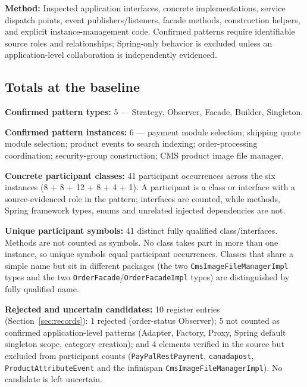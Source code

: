 \documentclass[11pt,a4paper]{article}
\begin{document}
\textbf{Method:} Inspected application interfaces, concrete implementations, service dispatch points, event publishers/listeners, facade methods, construction helpers, and explicit instance-management code. Confirmed patterns require identifiable source roles and relationships; Spring-only behavior is excluded unless an application-level collaboration is independently evidenced.

\subsection{Totals at the baseline}

\textbf{Confirmed pattern types:} 5 --- Strategy, Observer, Facade, Builder, Singleton.

\textbf{Confirmed pattern instances:} 6 --- payment module selection; shipping quote module selection; product events to search indexing; order-processing coordination; security-group construction; CMS product image file manager.

\textbf{Concrete participant classes:} 41 participant occurrences across the six instances (8 + 8 + 12 + 8 + 4 + 1). A participant is a class or interface with a source-evidenced role in the pattern; interfaces are counted, while methods, Spring framework types, enums and unrelated injected dependencies are not.

\textbf{Unique participant symbols:} 41 distinct fully qualified class/interfaces. Methods are not counted as symbols. No class takes part in more than one instance, so unique symbols equal participant occurrences. Classes that share a simple name but sit in different packages (the two \texttt{Cms\allowbreak{}Image\allowbreak{}File\allowbreak{}Manager\allowbreak{}Impl} types and the two \texttt{Order\allowbreak{}Facade}/\texttt{Order\allowbreak{}Facade\allowbreak{}Impl} types) are distinguished by fully qualified name.

\textbf{Rejected and uncertain candidates:} 10 register entries (Section~\ref{sec:records}): 1 rejected (order-status Observer); 5 not counted as confirmed application-level patterns (Adapter, Factory, Proxy, Spring default singleton scope, category creation); and 4 elements verified in the source but excluded from participant counts (\texttt{Pay\allowbreak{}Pal\allowbreak{}Rest\allowbreak{}Payment}, \texttt{canadapost}, \texttt{Product\allowbreak{}Attribute\allowbreak{}Event} and the infinispan \texttt{Cms\allowbreak{}Image\allowbreak{}File\allowbreak{}Manager\allowbreak{}Impl}). No candidate is left uncertain.
\end{document}
